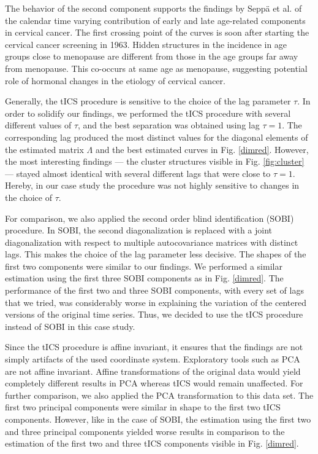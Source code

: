 \documentclass{llncs}
\begin{document}
 The behavior of the second component supports the findings by Sepp\"{a} et al. \cite{JP3} of the calendar time varying contribution of early and late age-related components in cervical cancer.  The first crossing point of the curves is soon after starting the cervical cancer screening in 1963. Hidden structures in the incidence in age groups close to menopause  are different from those in the age groups far away from menopause. This co-occurs at same age as menopause, suggesting potential role of hormonal changes in the etiology of cervical cancer. 


Generally, the tICS procedure is sensitive to the choice of the lag parameter $\tau$. In order to solidify our findings, we performed the tICS procedure with several different values of $\tau$, and the best separation was obtained using lag $\tau=1$. The corresponding lag produced the most distinct values for the diagonal elements of the estimated matrix $\Lambda$ and the best estimated curves in Fig. \ref{dimred}. However, the most interesting findings --- the cluster structures visible in Fig. \ref{fig:cluster} --- stayed almost identical with several different  lags that were close to $\tau=1$. Hereby, in our case study the procedure  was not highly sensitive to changes in the choice of $\tau$. 

For comparison, we also applied the second order blind identification (SOBI) \cite{belouchrani1997} procedure. In SOBI, the second diagonalization is replaced with a joint diagonalization with respect to multiple autocovariance matrices with distinct lags. This makes the choice of the lag parameter less decisive. The shapes of the first two components were similar to our findings. We performed a similar estimation using the first three SOBI components as in Fig. \ref{dimred}. The performance of the first two and three SOBI components, with every set of lags that we tried, was considerably worse in explaining the variation of the centered versions of the original time series. Thus, we decided to use the tICS procedure instead of SOBI in this case study.



Since the  tICS procedure is affine invariant, it ensures that the findings are not simply artifacts of the used coordinate system. Exploratory tools such as PCA are not affine invariant.
Affine transformations of the original data would yield completely different results in PCA whereas tICS would remain unaffected. For further comparison, we also applied the PCA transformation to this data set.  The first two principal components were similar in shape to the first two tICS components. However, like in the case of SOBI, the estimation using the first two and three principal components yielded worse results in comparison to the estimation of the first two and three tICS components visible in  Fig. \ref{dimred}.
\end{document}

